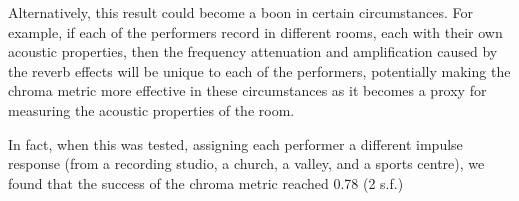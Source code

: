 \documentclass[oneside, class=book, 12pt, crop=false]{standalone}
\begin{document}
Alternatively, this result could become a boon in certain circumstances. For example, if each of the performers record in different rooms, each with their own acoustic properties, then the frequency attenuation and amplification caused by the reverb effects will be unique to each of the performers, potentially making the chroma metric more effective in these circumstances as it becomes a proxy for measuring the acoustic properties of the room.

In fact, when this was tested, assigning each performer a different impulse response (from a recording studio, a church, a valley, and a sports centre), we found that the success of the chroma metric reached 0.78 (2 s.f.)










\ifstandalone
  \printbibliography
\fi
    
\end{document}
